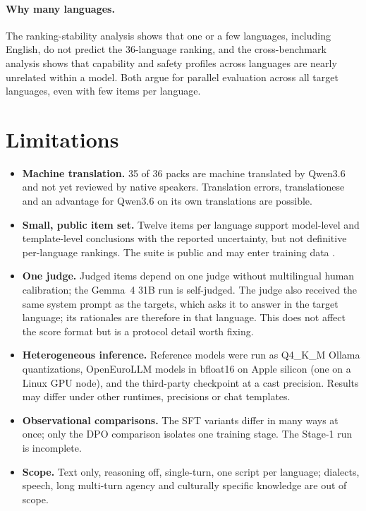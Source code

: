 \documentclass[11pt]{article}
\begin{document}
\paragraph{Why many languages.} The ranking-stability analysis shows that one or a few languages, including English, do not predict the 36-language ranking, and the cross-benchmark analysis shows that capability and safety profiles across languages are nearly unrelated within a model. Both argue for parallel evaluation across all target languages, even with few items per language.

\section{Limitations}
\label{sec:limitations}
\begin{itemize}
\item \textbf{Machine translation.} 35 of 36 packs are machine translated by Qwen3.6 and not yet reviewed by native speakers. Translation errors, translationese \citep{artetxe2020translation} and an advantage for Qwen3.6 on its own translations are possible.
\item \textbf{Small, public item set.} Twelve items per language support model-level and template-level conclusions with the reported uncertainty, but not definitive per-language rankings. The suite is public and may enter training data \citep{sainz2023contamination}.
\item \textbf{One judge.} Judged items depend on one judge without multilingual human calibration; the Gemma~4 31B run is self-judged. The judge also received the same system prompt as the targets, which asks it to answer in the target language; its rationales are therefore in that language. This does not affect the score format but is a protocol detail worth fixing.
\item \textbf{Heterogeneous inference.} Reference models were run as Q4\_K\_M Ollama quantizations, OpenEuroLLM models in bfloat16 on Apple silicon (one on a Linux GPU node), and the third-party checkpoint at a cast precision. Results may differ under other runtimes, precisions or chat templates.
\item \textbf{Observational comparisons.} The SFT variants differ in many ways at once; only the DPO comparison isolates one training stage. The Stage-1 run is incomplete.
\item \textbf{Scope.} Text only, reasoning off, single-turn, one script per language; dialects, speech, long multi-turn agency and culturally specific knowledge are out of scope.
\end{itemize}
\end{document}
